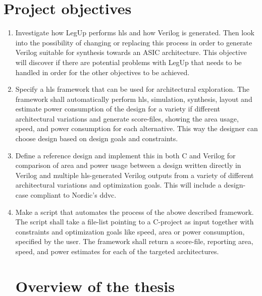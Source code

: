 \section{Project objectives}
\begin{enumerate}
    \item Investigate how LegUp performs \gls{hls} and how Verilog is generated. Then look into the possibility of changing or replacing this process in order to generate Verilog suitable for synthesis towards an ASIC architecture. This objective will discover if there are potential problems with LegUp that needs to be handled in order for the other objectives to be achieved.
    \item Specify a \gls{hls} framework that can be used for architectural exploration. The framework shall automatically perform \gls{hls}, simulation, synthesis, layout and estimate power consumption of the design for a variety if different architectural variations and generate score-files, showing the area usage, speed, and power consumption for each alternative. This way the designer can choose design based on design goals and constraints.
    \item Define a reference design and implement this in both C and Verilog for comparison of area and power usage between a design written directly in Verilog and multiple \gls{hls}-generated Verilog outputs from a variety of different architectural variations and optimization goals. This will include a design-case compliant to Nordic’s \gls{ddvc}.
    \item Make a script that automates the process of the abowe described framework. The script shall take a file-list pointing to a C-project as input together with constraints and optimization goals like speed, area or power consumption, specified by the user. The framework shall return a score-file, reporting area, speed, and power estimates for each of the targeted architectures.
\section{Overview of the thesis}

\end{enumerate}